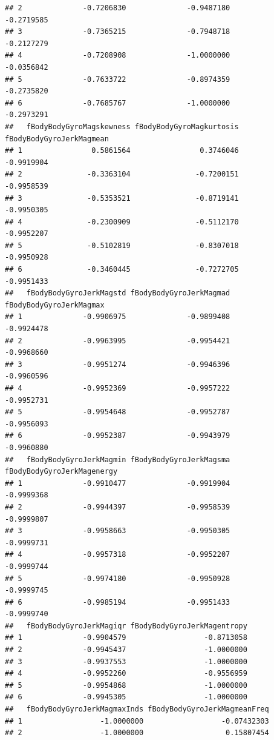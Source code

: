 \documentclass[
]{article}
\begin{document}
\begin{verbatim}
## 2              -0.7206830              -0.9487180               -0.2719585
## 3              -0.7365215              -0.7948718               -0.2127279
## 4              -0.7208908              -1.0000000               -0.0356842
## 5              -0.7633722              -0.8974359               -0.2735820
## 6              -0.7685767              -1.0000000               -0.2973291
##   fBodyBodyGyroMagskewness fBodyBodyGyroMagkurtosis fBodyBodyGyroJerkMagmean
## 1                0.5861564                0.3746046               -0.9919904
## 2               -0.3363104               -0.7200151               -0.9958539
## 3               -0.5353521               -0.8719141               -0.9950305
## 4               -0.2300909               -0.5112170               -0.9952207
## 5               -0.5102819               -0.8307018               -0.9950928
## 6               -0.3460445               -0.7272705               -0.9951433
##   fBodyBodyGyroJerkMagstd fBodyBodyGyroJerkMagmad fBodyBodyGyroJerkMagmax
## 1              -0.9906975              -0.9899408              -0.9924478
## 2              -0.9963995              -0.9954421              -0.9968660
## 3              -0.9951274              -0.9946396              -0.9960596
## 4              -0.9952369              -0.9957222              -0.9952731
## 5              -0.9954648              -0.9952787              -0.9956093
## 6              -0.9952387              -0.9943979              -0.9960880
##   fBodyBodyGyroJerkMagmin fBodyBodyGyroJerkMagsma fBodyBodyGyroJerkMagenergy
## 1              -0.9910477              -0.9919904                 -0.9999368
## 2              -0.9944397              -0.9958539                 -0.9999807
## 3              -0.9958663              -0.9950305                 -0.9999731
## 4              -0.9957318              -0.9952207                 -0.9999744
## 5              -0.9974180              -0.9950928                 -0.9999745
## 6              -0.9985194              -0.9951433                 -0.9999740
##   fBodyBodyGyroJerkMagiqr fBodyBodyGyroJerkMagentropy
## 1              -0.9904579                  -0.8713058
## 2              -0.9945437                  -1.0000000
## 3              -0.9937553                  -1.0000000
## 4              -0.9952260                  -0.9556959
## 5              -0.9954868                  -1.0000000
## 6              -0.9945305                  -1.0000000
##   fBodyBodyGyroJerkMagmaxInds fBodyBodyGyroJerkMagmeanFreq
## 1                  -1.0000000                  -0.07432303
## 2                  -1.0000000                   0.15807454

\end{verbatim}
\end{document}

